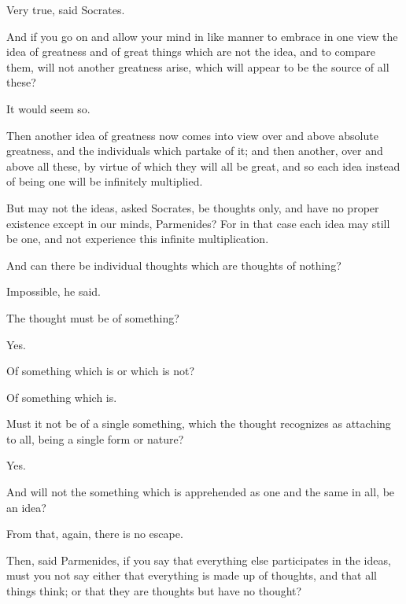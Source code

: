 \documentclass[11pt,letter]{article}
\begin{document}
\par  Very true, said Socrates.

\par  And if you go on and allow your mind in like manner to embrace in one view the idea of greatness and of great things which are not the idea, and to compare them, will not another greatness arise, which will appear to be the source of all these?

\par  It would seem so.

\par  Then another idea of greatness now comes into view over and above absolute greatness, and the individuals which partake of it; and then another, over and above all these, by virtue of which they will all be great, and so each idea instead of being one will be infinitely multiplied.

\par  But may not the ideas, asked Socrates, be thoughts only, and have no proper existence except in our minds, Parmenides? For in that case each idea may still be one, and not experience this infinite multiplication.

\par  And can there be individual thoughts which are thoughts of nothing?

\par  Impossible, he said.

\par  The thought must be of something?

\par  Yes.

\par  Of something which is or which is not?

\par  Of something which is.

\par  Must it not be of a single something, which the thought recognizes as attaching to all, being a single form or nature?

\par  Yes.

\par  And will not the something which is apprehended as one and the same in all, be an idea?

\par  From that, again, there is no escape.

\par  Then, said Parmenides, if you say that everything else participates in the ideas, must you not say either that everything is made up of thoughts, and that all things think; or that they are thoughts but have no thought?
\end{document}
